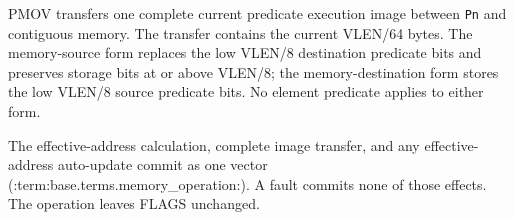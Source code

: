 PMOV transfers one complete current predicate execution image between
\texttt{Pn} and contiguous memory. The transfer contains the current VLEN/64
bytes. The memory-source form replaces the low VLEN/8 destination predicate
bits and preserves storage bits at or above VLEN/8; the memory-destination form
stores the low VLEN/8 source predicate bits. No
element predicate applies to either form.

The effective-address calculation, complete image transfer, and any
effective-address auto-update commit as one vector (:term:base.terms.memory_operation:).  A fault
commits none of those effects.  The operation leaves FLAGS unchanged.
